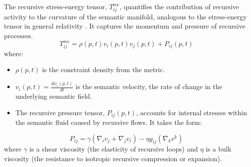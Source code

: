 The recursive stress-energy tensor, \(T_{ij}^{\text{rec}}\), quantifies the contribution of recursive activity to the curvature of the semantic manifold, analogous to the stress-energy tensor in general relativity \autocite{Einstein1915}. It captures the momentum and pressure of recursive processes.
\begin{equation}
T_{ij}^{\text{rec}} = \rho(p,t) v_i(p,t) v_j(p,t) + P_{ij}(p,t)
\end{equation}
where:
\begin{itemize}
    \item \(\rho(p,t)\) is the constraint density from the metric.
    \item \(v_i(p,t) = \frac{d\psi_i(p,t)}{dt}\) is the semantic velocity, the rate of change in the underlying semantic field.
    \item The recursive pressure tensor, \(P_{ij}(p,t)\), accounts for internal stresses within the semantic fluid caused by recursive flows. It takes the form:
\end{itemize}
\begin{equation}
P_{ij} = \gamma(\nabla_i v_j + \nabla_j v_i) - \eta g_{ij} (\nabla_k v^k)
\end{equation}
where \(\gamma\) is a shear viscosity (the elasticity of recursive loops) and \(\eta\) is a bulk viscosity (the resistance to isotropic recursive compression or expansion).